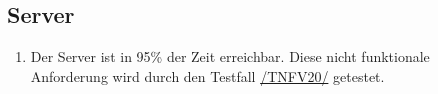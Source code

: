 \subsection*{Server}

\begin{samepage}
    \begin{enumerate}[label=\textbf{/NFV\arabic*0/}, align=left, start=2]
        \item \label{/NFV20/} Der \Gls{Server} ist in 95\% der Zeit erreichbar. Diese nicht funktionale Anforderung wird durch den Testfall \hyperref[/TNFV20/]{/TNFV20/} getestet.
    \end{enumerate}
\end{samepage}